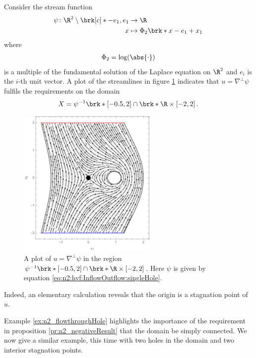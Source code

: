 \begin{example}\label{ex:n2_flowthroughHole}
  Consider the stream function
  \begin{equation}
    \begin{aligned}
    \psi\colon \R^2\setminus\brk[c]*{-e_1,e_1}&\to\R \\
    x&\mapsto\Phi_2\brk*{x-e_1}+x_1
    \end{aligned}\label{eq:n2:hvf:InflowOutflow:singleHole}
  \end{equation}
  where
  \begin{align}
    \Phi_2=\log(\abs{\cdot})\label{eq:n2_defPhi}
  \end{align}
  is a multiple of the fundamental solution of the Laplace equation on $\R^2$ and $e_i$ is the $i$-th unit vector.
  A plot of the streamlines in figure \ref{pl:n2_hvf_InflowOutflow_asymmetric_single} indicates that $u=\nabla^\perp\psi$ fulfils the
  requirements on the domain
  $$X=\psi^{-1}\brk*{[-0.5,2]}\cap \brk*{\R\times[-2,2]}\,.$$
  \begin{figure}%
    \centering
    \includegraphics[width=0.6\textwidth]{../Plots/n2_hvf_InflowOutflow_asymmetric_gray_2.pdf}
    \caption{A plot of $u=\nabla^\perp\psi$ in the region $\psi^{-1}\brk*{[-0.5,2]}\cap \brk*{\R\times[-2,2]}$.
    Here $\psi$ is given by equation \eqref{eq:n2:hvf:InflowOutflow:singleHole}.}
    \label{pl:n2_hvf_InflowOutflow_asymmetric_single}
  \end{figure}%
  Indeed, an elementary calculation reveals that the origin is a stagnation point of $u$.
\end{example}
Example \ref{ex:n2_flowthroughHole} highlights the importance of the requirement in proposition \ref{pr:n2_negativeResult} that the domain be simply connected.
We now give a similar example, this time with two holes in the domain and two interior stagnation points.

